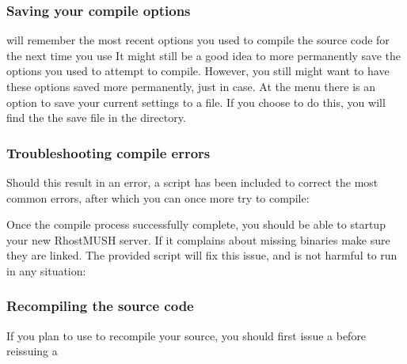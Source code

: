 \documentclass[letterpaper,10pt,english]{sphinxmanual}
\begin{document}
\subsubsection{Saving your compile options}
\label{\detokenize{install:saving-your-compile-options}}
\sphinxAtStartPar
{} will remember the most recent options you used to compile
the source code for the next time you use  It might still
be a good idea to more permanently save the options you used to attempt to
compile. However, you still might want to have these options saved more
permanently, just in case. At the  menu there is an
option to save your current settings to a file. If you choose to do this,
you will find the the save file in the  directory.


\subsubsection{Troubleshooting compile errors}
\label{\detokenize{install:troubleshooting-compile-errors}}
\sphinxAtStartPar
Should this result in an error, a script has been included to correct the most
common errors, after which you can once more try to compile:

\begin{sphinxVerbatim}[commandchars=\\\{\}]
 
\end{sphinxVerbatim}

\sphinxAtStartPar
Once the compile process successfully complete, you should be able to start\sphinxhyphen{}up
your new RhostMUSH server. If it complains about missing binaries make sure
they are linked. The provided script will fix this issue, and is not harmful
to run in any situation:

\begin{sphinxVerbatim}[commandchars=\\\{\}]
 
\end{sphinxVerbatim}


\subsubsection{Recompiling the source code}
\label{\detokenize{install:recompiling-the-source-code}}
\sphinxAtStartPar
If you plan to use  to recompile your source, you should
first issue a  before re\sphinxhyphen{}issuing a 
\end{document}
